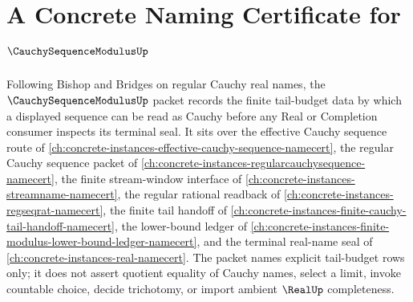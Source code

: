 \chapter{A Concrete Naming Certificate for $\CauchySequenceModulusUp$}
\label{ch:concrete-instances-cauchy-sequence-modulus-namecert}

Following Bishop and Bridges on regular Cauchy real names, the $\CauchySequenceModulusUp$ packet records the finite tail-budget data by which a displayed sequence can be read as Cauchy before any Real or Completion consumer inspects its terminal seal. It sits over the effective Cauchy sequence route of \autoref{ch:concrete-instances-effective-cauchy-sequence-namecert}, the regular Cauchy sequence packet of \autoref{ch:concrete-instances-regularcauchysequence-namecert}, the finite stream-window interface of \autoref{ch:concrete-instances-streamname-namecert}, the regular rational readback of \autoref{ch:concrete-instances-regseqrat-namecert}, the finite tail handoff of \autoref{ch:concrete-instances-finite-cauchy-tail-handoff-namecert}, the lower-bound ledger of \autoref{ch:concrete-instances-finite-modulus-lower-bound-ledger-namecert}, and the terminal real-name seal of \autoref{ch:concrete-instances-real-namecert}. The packet names explicit tail-budget rows only; it does not assert quotient equality of Cauchy names, select a limit, invoke countable choice, decide trichotomy, or import ambient $\RealUp$ completeness.

